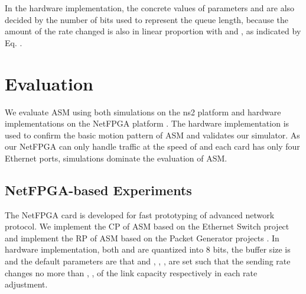 \documentclass{sig-alternate-10pt}
\begin{document}
In the hardware implementation, the concrete values of parameters  and  are also decided by the number of bits used to represent the queue length, because the amount of the rate changed is also in linear proportion with  and , as indicated by Eq. .


\iffalse
\textbf{Quantization}
In the hardware implementation, the feedback information is quantized into several bits. In general, the quantization is linearized. For example, when the buffer size is  and the number of bits used to represent the instantaneous queue length is , the quantized queue length changes  when the real queue length changes . However, this quantized result is not balanced to the rate adjustment algorithm. Assume the target queue length is , the quantized queue length is smaller than the target point only when it takes value in , while larger than the target point when it takes value in . It is better to let the rate adjustment algorithm see that quantized queue length is smaller than the target point when it takes value in , and vice versa. Or else, in the rate adjustment, the parameters need to be very small for the condition that the queue length is smaller than the target point, and vice versa.\\
\fi


\section{Evaluation}
We evaluate ASM using both simulations on the ns2 platform and hardware implementations on the NetFPGA platform . The hardware implementation is used to confirm the basic motion pattern of ASM and validates our simulator. As our NetFPGA can only handle traffic at the speed of  and each card has only four Ethernet ports, simulations dominate the evaluation of ASM.


\subsection{NetFPGA-based Experiments}
The NetFPGA card is developed for fast prototyping of advanced network protocol. We implement the CP of ASM based on the Ethernet Switch project and implement the RP of ASM based on the Packet Generator projects . In hardware implementation, both  and  are quantized into 8 bits, the buffer size is  and the default parameters are that  and , , ,  are set such that the sending rate changes no more than , ,  of the link capacity respectively in each rate adjustment. 
\end{document}
